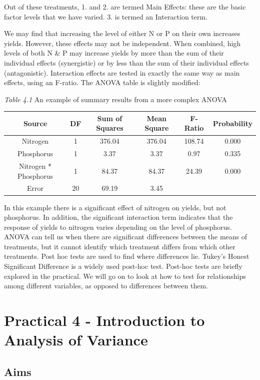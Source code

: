 \documentclass[
]{book}
\begin{document}
Out of these treatments, 1. and 2. are termed Main Effects: these are the basic factor levels that we have varied. 3. is termed an Interaction term.

We may find that increasing the level of either N or P on their own increases yields. However, these effects may not be independent. When combined, high levels of both N \& P may increase yields by more than the sum of their individual effects (synergistic) or by less than the sum of their individual effects (antagonistic). Interaction effects are tested in exactly the same way as main effects, using an F-ratio. The ANOVA table is slightly modified:

\emph{Table 4.1} An example of summary results from a more complex ANOVA

\begin{longtable}[]{@{}cccccc@{}}
\toprule\noalign{}
Source & DF & Sum of Squares & Mean Square & F-Ratio & Probability \\
\midrule\noalign{}
\endhead
\bottomrule\noalign{}
\endlastfoot
Nitrogen & 1 & 376.04 & 376.04 & 108.74 & 0.000 \\
Phosphorus & 1 & 3.37 & 3.37 & 0.97 & 0.335 \\
Nitrogen * Phosphorus & 1 & 84.37 & 84.37 & 24.39 & 0.000 \\
Error & 20 & 69.19 & 3.45 & & \\
\end{longtable}

In this example there is a significant effect of nitrogen on yields, but not phosphorus. In addition, the significant interaction term indicates that the response of yields to nitrogen varies depending on the level of phosphorus. ANOVA can tell us when there are significant differences between the means of treatments, but it cannot identify which treatment differs from which other treatments. Post hoc tests are used to find where differences lie. Tukey's Honest Significant Difference is a widely used post-hoc test. Post-hoc tests are briefly explored in the practical. We will go on to look at how to test for relationships among different variables, as opposed to differences between them.

\section{Practical 4 - Introduction to Analysis of Variance}\label{practical-4---introduction-to-analysis-of-variance}

\subsection{Aims}\label{aims}
\end{document}
